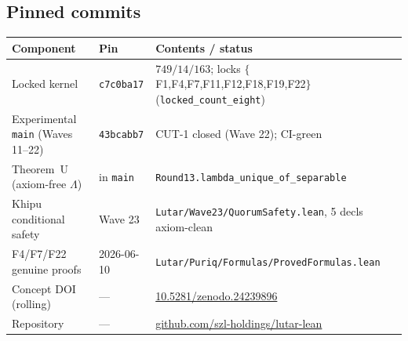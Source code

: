 \documentclass[11pt,letterpaper]{article}
\theoremstyle{definition}
\newcommand{\Lam}{\Lambda}
\begin{document}
\subsection{Pinned commits}
\begin{center}\small
\begin{tabular}{@{}lll@{}}
\toprule
\textbf{Component} & \textbf{Pin} & \textbf{Contents / status} \\
\midrule
Locked kernel & \texttt{c7c0ba17} & $749/14/163$; locks $\{$F1,F4,F7,F11,F12,F18,F19,F22$\}$ (\texttt{locked\_count\_eight}) \\
Experimental \texttt{main} (Waves 11--22) & \texttt{43bcabb7} & CUT-1 closed (Wave 22); CI-green \\
Theorem~U (axiom-free $\Lam$) & in \texttt{main} & \texttt{Round13.lambda\_unique\_of\_separable} \\
Khipu conditional safety & Wave 23 & \texttt{Lutar/Wave23/QuorumSafety.lean}, 5 decls axiom-clean \\
F4/F7/F22 genuine proofs & 2026-06-10 & \texttt{Lutar/Puriq/Formulas/ProvedFormulas.lean} \\
Concept DOI (rolling) & --- & \href{https://doi.org/10.5281/zenodo.24239896}{10.5281/zenodo.24239896} \\
Repository & --- & \href{https://github.com/szl-holdings/lutar-lean}{github.com/szl-holdings/lutar-lean} \\
\bottomrule
\end{tabular}
\end{center}
\end{document}
